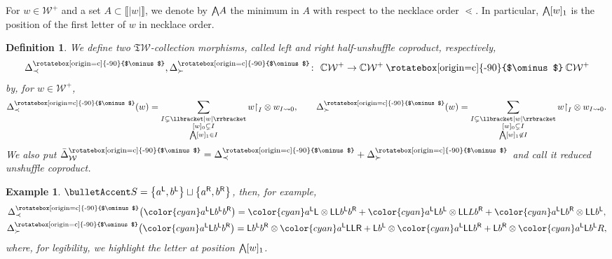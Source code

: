 \documentclass[pdftex]{sigma}
\newcommand\overt{\mathbin{\text{\rotatebox[origin=c]{-90}{$\ominus$}}}}
\newcommand{\interval}[1]{\llbracket #1 \rrbracket}
\renewcommand{\restriction}[2]{{#1\mathbin{\upharpoonright}_{#2}}}
\newcommand{\translucidation}[2]{{{#1}_{#2\leadsto0}}}
\newcommand{\linearspan}[1]{{\CC #1}}
\newcommand{\stdl}{\lessdot}
\newcommand{\bigwedgedot}{{\mathop{\bigwedge\hspace{-7.8pt}\raisebox{-1pt}[0pt][0pt]{$\cdot$}\hspace{3pt}}\nolimits}}
\newcommand{\bigwedgedots}{{\mathop{\bigwedge\hspace{-6.5pt}\raisebox{-1.5pt}[0pt][0pt]{$\cdot$}\hspace{2pt}}\nolimits}}
\newcommand{\SWc}{{\mathfrak{T}\mathcal{W}}}
\newcommand\IWc{\mathcal{W}}
\newcommand{\vcp}{\Delta^{\overt}}
\newcommand\barvcpS{\bar{\Delta}^{\overt}_{\IWc}}
\newcommand\vcpSpr{\vcp_{\prec}}
\newcommand\vcpSsu{\vcp_{\succ}}
\newcommand\LL{{\mathsf{L}}}
\newcommand\RR{{\mathsf{R}}}
\newcommand\cyan[1]{{\color{cyan}#1}}
\def\CC{\mathbb{C}}
\numberwithin{equation}{section}
\newtheorem{Definition}[Theorem]{Definition}
\newtheorem{Example}[Theorem]{Example}
\begin{document}
For $w\in \IWc^+$
and a set
$A \subset \interval{|w|}$, we denote by $\bigwedgedot A$ the minimum in $A$ with respect to the necklace order $\stdl$.
In particular, $\bigwedgedot [w]_1$ is the position of the first letter of $w$ in necklace order.
\begin{Definition}
	We define two $\SWc$-collection morphisms, called left and right {\it half-unshuffle coproduct}, respectively,
	\[\vcpSpr, \vcpSsu\colon \ \linearspan{\IWc^{+}} \to \linearspan{\IWc^+} \overt \linearspan{\IWc^+}\] by, for $w\in \IWc^+$,
	\begin{equation*}
		\vcpSpr(w)
		= \sum_{\substack{I \subsetneq \interval{|w|} \\ [w]_0 \subsetneq I \\ \bigwedgedots [w]_1 \in I}} \restriction{w}{I} \otimes \translucidation{w}{I},\qquad
 \vcpSsu(w) = \sum_{\substack{I \subsetneq \interval{|w|} \\ [w]_0 \subsetneq I \\ \bigwedgedots [w]_1 \not\in I}} \restriction{w}{I} \otimes \translucidation{w}{I}.
	\end{equation*}
	We also put $\barvcpS=\vcpSpr + \vcpSsu$ and call it {\it reduced unshuffle coproduct}.
\end{Definition}

\begin{Example}
	$\bulletAccent S = \big\{a^{\LL},b^{\LL}\big\}\sqcup \big\{a^{\RR},b^{\RR}\big\}$,
	then, for example,
	\begin{gather*}
		\vcpSpr\big( \cyan{a^{\LL}}{\LL}b^{\LL}b^{\RR} \big) %
		 =
		\cyan{a^{\LL}}{\LL} \otimes {\LL} {\LL} b^{\LL} b^{\RR}
		+
		\cyan{a^{\LL}}{\LL} b^{\LL} \otimes {\LL} {\LL} L b^{\RR}
		+
		\cyan{a^{\LL}}{\LL} b^{\RR} \otimes {\LL} {\LL} b^{\LL} ,\\
		\vcpSsu\big( \cyan{a^{\LL}}{\LL} b^{\LL} b^{\RR} \big)
		 =
		\LL b^{\LL} b^{\RR} \otimes \cyan{a^{\LL}}\LL \LL \RR
		+
		\LL b^{\LL} \otimes \cyan{a^{\LL}}\LL \LL b^{\RR}
		+
		\LL b^{\RR} \otimes \cyan{a^{\LL}}\LL b^{\LL} R,
	\end{gather*}
	where, for legibility, we highlight the letter at position $\bigwedgedot[w]_1$.
 \end{Example}
\end{document}
